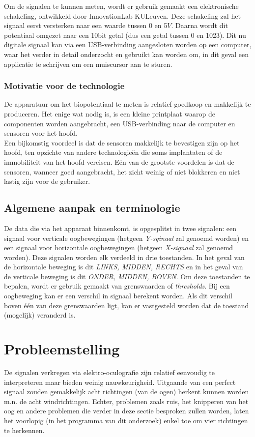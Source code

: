 \documentclass{article}
\begin{document}
Om de signalen te kunnen meten, wordt er gebruik gemaakt een elektronische schakeling, ontwikkeld door InnovationLab KULeuven. Deze schakeling zal het signaal eerst versterken naar een waarde tussen 0 en 5$V$. Daarna wordt dit potentiaal omgezet naar een 10bit getal (dus een getal tussen 0 en 1023). Dit nu digitale signaal kan via een USB-verbinding aangesloten worden op een computer, waar het verder in detail onderzocht en gebruikt kan worden om, in dit geval een applicatie te schrijven om een muiscursor aan te sturen.

\subsubsection*{Motivatie voor de technologie}
De apparatuur om het biopotentiaal te meten is relatief goedkoop en makkelijk te produceren. Het enige wat nodig is, is een kleine printplaat waarop de componenten worden aangebracht, een USB-verbinding naar de computer en sensoren voor het hoofd.\\
Een bijkomstig voordeel is dat de sensoren makkelijk te bevestigen zijn op het hoofd, ten opzichte van andere technologie\"en die soms implantaten of de immobiliteit van het hoofd vereisen. E\'en van de grootste voordelen is dat de sensoren, wanneer goed aangebracht, het zicht weinig of niet blokkeren en niet lastig zijn voor de gebruiker.

\subsection{Algemene aanpak en terminologie}
De data die via het apparaat binnenkomt, is opgesplitst in twee signalen: een signaal voor verticale oogbewegingen (hetgeen \textit{Y-sginaal} zal genoemd worden) en een signaal voor horizontale oogbewegingen (hetgeen \textit{X-signaal} zal genoemd worden). Deze signalen worden elk verdeeld in drie toestanden. In het geval van de horizontale beweging is dit \textit{LINKS, MIDDEN, RECHTS} en in het geval van de verticale beweging is dit \textit{ONDER, MIDDEN, BOVEN}. Om deze toestanden te bepalen, wordt er gebruik gemaakt van grenswaarden of \textit{thresholds}. Bij een oogbeweging kan er een verschil in signaal berekent worden. Als dit verschil boven \'e\'en van deze grenswaarden ligt, kan er vastgesteld worden dat de toestand (mogelijk) veranderd is.
\section{Probleemstelling}
De signalen verkregen via elektro-oculografie zijn relatief eenvoudig te interpreteren maar bieden weinig nauwkeurigheid. Uitgaande van een perfect signaal zouden gemakkelijk acht richtingen (van de ogen) herkent kunnen worden m.n. de acht windrichtingen. Echter, problemen zoals ruis, het knipperen van het oog en andere problemen die verder in deze sectie besproken zullen worden, laten het voorlopig (in het programma van dit onderzoek) enkel toe om vier richtingen te herkennen. 
\end{document}
